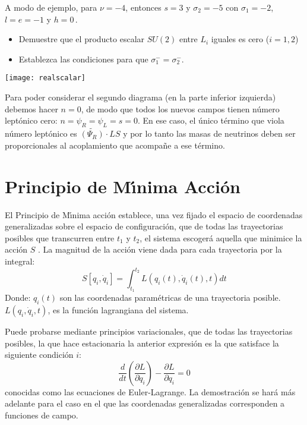 \begin{frame}
A modo de ejemplo,
para $\nu=-4$, entonces $s=3$ y $\sigma_2=-5$ con $\sigma_1=-2$, $l=e=-1$ y $h=0$\,.



  \begin{itemize}
  \item Demuestre que el producto escalar $SU(2)$ entre $L_i$ iguales es cero ($i=1,2$) 
  \item   Establezca las condiciones para que $\sigma_1^-=\sigma_2^-$.
  \end{itemize}

\end{frame}

\newpage
\texttt{[image: realscalar]}

Para poder considerar el segundo diagrama (en la parte inferior izquierda) debemos hacer $n=0$, de modo que todos los nuevos campos tienen número leptónico cero: $n=\psi_R=\psi_L=s=0$. En ese caso, el único término que viola número leptónico es
$\widetilde{\left({\Psi}_{R}\right)} \cdot L S$ y por lo tanto las masas de neutrinos deben ser proporcionales al acoplamiento que acompañe a ese término.

\section{Principio de M\'\i nima Acci\'on}
\label{sec:la}

El Principio de M\'\i nima acci\'on establece, una vez fijado el espacio de
coordenadas generalizadas sobre el espacio de configuraci\'on, que de
todas las trayectorias posibles que transcurren entre $t_1$ y $t_2$,
el sistema escoger\'a aquella que minimice la acci\'on $S$
\cite{ActionPhysics}.  La magnitud de la acci\'on viene dada para cada
trayectoria por la integral:
\begin{equation}
  \label{eq:la}
   S\left[q_i,\dot{q}_i\right] = \int_{t_{1}}^{t_{2}} L(q_i(t), \dot{q}_i(t),t) dt
\end{equation}
Donde:
$q_i(t)$ son las coordenadas param\'etricas de una trayectoria posible.
$L(q_i,\dot{q}_i,t)$, es la funci\'on lagrangiana del sistema.


Puede probarse mediante principios variacionales, que de todas las trayectorias posibles, la que hace  estacionaria la anterior expresi\'on es la que satisface la siguiente condici\'on $i$:
\begin{equation}
  \label{eq:eel}
 \frac{d}{dt} \left ( \frac{\partial L}{\partial\dot{q}_i} \right ) - \frac{\partial L}{\partial q_i} = 0
\end{equation}
conocidas como las ecuaciones de Euler-Lagrange. La demostraci\'on se
har\'a m\'as adelante para el caso en el que las coordenadas generalizadas
corresponden a funciones de campo. 

